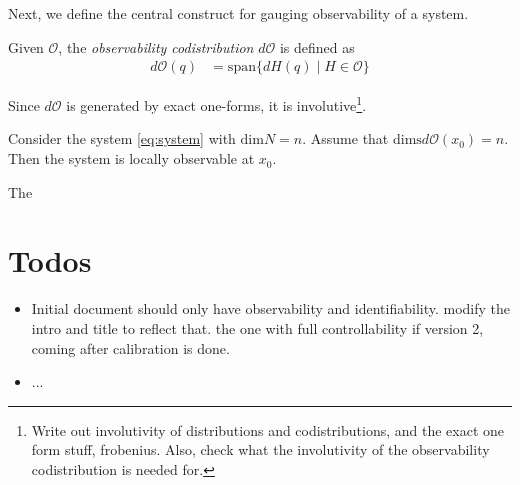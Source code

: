 Next, we define the central construct for gauging observability of a system. 
\begin{defn}
Given $\mathscr{O}$, the \textit{observability codistribution} $d\mathscr{O}$ is defined as
\begin{align}
d\mathscr{O}(q) & = {} \text{span}\{d H(q) \mid H \in \mathscr{O}\}
\end{align}
\end{defn}
Since $d\mathscr{O}$ is generated by exact one-forms, {\color{red}it is involutive}\footnote{{\color{red}Write out involutivity of distributions and codistributions, and the exact one form stuff, frobenius. Also, check what the involutivity of the observability codistribution is needed for.}}. 

\begin{thm}
Consider the system \ref{eq:system} with $\text{dim}N = n$. Assume that $\text{dims}d\mathscr{O}(x_0) = n$. Then the system is locally observable at $x_0$.  
\end{thm}
The 




\section{Todos}
\begin{itemize}
	\item Initial document should only have observability and identifiability. modify the intro and title to reflect that. the one with full controllability if version 2, coming after calibration is done. 
	\item ...
\end{itemize}

% 
% 




